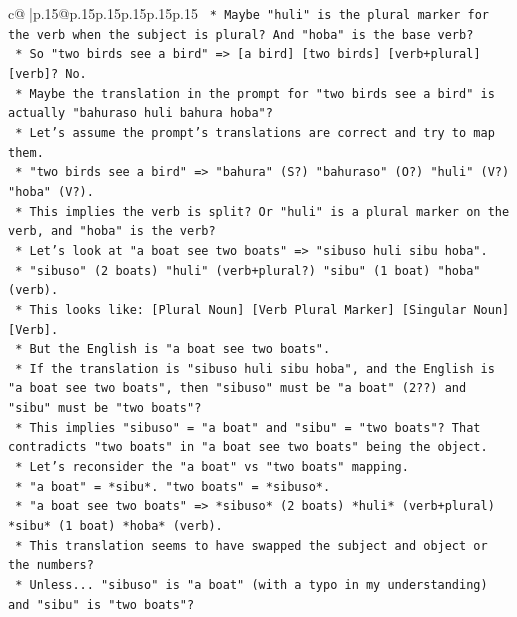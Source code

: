 \documentclass{article}
\begin{document}
{\begin{supertabular}{c@{$\;$}|p{.15\linewidth}@{}p{.15\linewidth}p{.15\linewidth}p{.15\linewidth}p{.15\linewidth}p{.15\linewidth}}
{{{\texttt{            *   Maybe "huli" is the plural marker for the verb when the subject is plural? And "hoba" is the base verb?} \\
\texttt{            *   So "two birds see a bird" => {[}a bird{]} {[}two birds{]} {[}verb+plural{]} {[}verb{]}? No.} \\
\texttt{            *   Maybe the translation in the prompt for "two birds see a bird" is actually "bahuraso huli bahura hoba"?} \\
\texttt{            *   Let's assume the prompt's translations are correct and try to map them.} \\
\texttt{            *   "two birds see a bird" => "bahura" (S?) "bahuraso" (O?) "huli" (V?) "hoba" (V?).} \\
\texttt{            *   This implies the verb is split? Or "huli" is a plural marker on the verb, and "hoba" is the verb?} \\
\texttt{            *   Let's look at "a boat see two boats" => "sibuso huli sibu hoba".} \\
\texttt{                *   "sibuso" (2 boats) "huli" (verb+plural?) "sibu" (1 boat) "hoba" (verb).} \\
\texttt{                *   This looks like: {[}Plural Noun{]} {[}Verb Plural Marker{]} {[}Singular Noun{]} {[}Verb{]}.} \\
\texttt{                *   But the English is "a boat see two boats".} \\
\texttt{                *   If the translation is "sibuso huli sibu hoba", and the English is "a boat see two boats", then "sibuso" must be "a boat" (2??) and "sibu" must be "two boats"?} \\
\texttt{                *   This implies "sibuso" = "a boat" and "sibu" = "two boats"? That contradicts "two boats" in "a boat see two boats" being the object.} \\
\texttt{                *   Let's reconsider the "a boat" vs "two boats" mapping.} \\
\texttt{                *   "a boat" = *sibu*. "two boats" = *sibuso*.} \\
\texttt{                *   "a boat see two boats" => *sibuso* (2 boats) *huli* (verb+plural) *sibu* (1 boat) *hoba* (verb).} \\
\texttt{                *   This translation seems to have swapped the subject and object or the numbers?} \\
\texttt{                *   Unless... "sibuso" is "a boat" (with a typo in my understanding) and "sibu" is "two boats"?} \\
}}}
\end{supertabular}}
\end{document}
